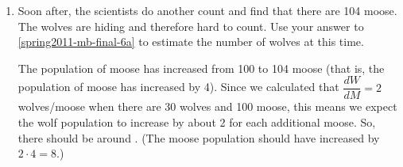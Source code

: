 \documentclass{article}
\begin{document}
\begin{enumerate}
\begin{enumerate}
    \begin{solution}
      It doesn't look easy to solve for $W$ in terms of $M$, so let's
      instead use implicit differentiation.  Since we're interested in
      $\dfrac{dW}{d\color{red}M\color{black}}$, we'll differentiate both
      sides of the given equation $\displaystyle \frac{W^3}{30} - 150M -
      MW + M^2 + 7100 = 0$ with respect to $M$:
      \begin{align*}
        \frac{d}{dM}\left(\frac{1}{30}\cdot W^ { 3} -150 M-M\cdot
          W+ M^ { 2} + 7100\right) &= \frac{d}{dM} (0) \\
        \frac{1}{30}\cdot \frac{d}{dM}
        \left(\fcolorbox{red}{white}{$\displaystyle
            \fcolorbox{blue}{white}{$\displaystyle W$}^ { 3}
            $}\right)-150-\frac{d}{dM}
        \left(\fcolorbox{green}{white}{$\displaystyle M$}\cdot
          \fcolorbox{green}{white}{$\displaystyle  W$}\right)+ 2 M &= 0 \\
        \frac{1}{30}\cdot 3 W^ { 2} 
          \frac{dW}{dM}-150-\left(M\cdot \frac{dW}{dM}+ W\right)+ 2
        M &= 0 \\
        \intertext{We are interested in what happens when there are 30
          wolves and 100 moose, so let's plug in $W = 30, M = 100$:} %
        90 \frac{dW}{dM}-150-\left(100 \frac{dW}{dM}+ 30\right)+ 200
        &= 0 \\
        -10 \frac{dW}{dM} + 20 &= 0 \\
        \frac{dW}{dM} &= 2
      \end{align*}
      So, $\dfrac{dW}{dM} = \boxed{2 \text{ wolves/moose}}$. 
    \end{solution}

  \item
    \begin{problem}[\nstretch{0.3}]
      Soon after, the scientists do another count and find that there are
      104 moose.  The wolves are hiding and therefore hard to count.  Use
      your answer to \ref{spring2011-mb-final-6a} to estimate the number of
      wolves at this time. 
    \end{problem}

    \begin{solution}
      The population of moose has increased from 100 to 104 moose (that
      is, the population of moose has increased by 4).  Since we
      calculated that $\dfrac{dW}{dM} = 2$ wolves/moose when there are 30
      wolves and 100 moose, this means we expect the wolf population to
      increase by about 2 for each additional moose.  So, there should be
      around .  (The moose population should have increased
      by $2 \cdot 4 = 8$.)


\end{solution}
\end{enumerate}
\end{enumerate}
\end{document}
